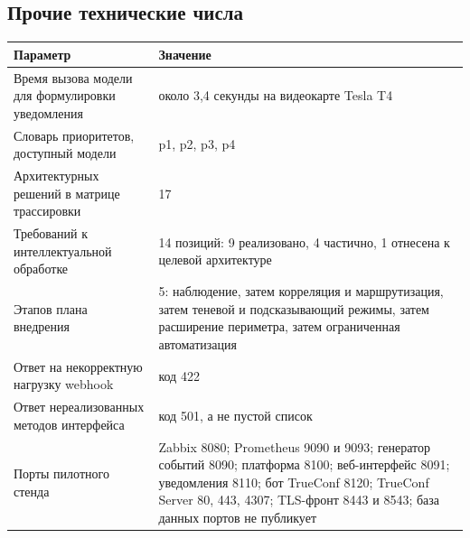 \documentclass[11pt]{article}
\begin{document}
\subsection{Прочие технические числа}
\begin{longtable}{|L{7cm}|L{9.5cm}|}
\hline
\textbf{Параметр} & \textbf{Значение} \\ \hline
Время вызова модели для формулировки уведомления & около 3,4 секунды на видеокарте Tesla T4 \\ \hline
Словарь приоритетов, доступный модели & p1, p2, p3, p4 \\ \hline
Архитектурных решений в матрице трассировки & 17 \\ \hline
Требований к интеллектуальной обработке & 14 позиций: 9 реализовано, 4 частично, 1 отнесена к целевой архитектуре \\ \hline
Этапов плана внедрения & 5: наблюдение, затем корреляция и маршрутизация, затем теневой и подсказывающий режимы, затем расширение периметра, затем ограниченная автоматизация \\ \hline
Ответ на некорректную нагрузку webhook & код 422 \\ \hline
Ответ нереализованных методов интерфейса & код 501, а не пустой список \\ \hline
Порты пилотного стенда & Zabbix 8080; Prometheus 9090 и 9093; генератор событий 8090; платформа 8100; веб-интерфейс 8091; уведомления 8110; бот TrueConf 8120; TrueConf Server 80, 443, 4307; TLS-фронт 8443 и 8543; база данных портов не публикует \\ \hline
\end{longtable}
\end{document}
